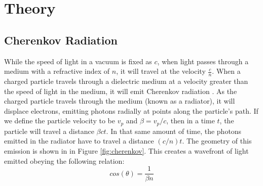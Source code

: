 
\chapter{Theory}
\label{ch:Theory}

\section{Cherenkov Radiation}
\label{sec:cherenkov}
While the speed of light in a vacuum is fixed as $c$, when light passes through a medium with a refractive index of $n$, it will travel at the velocity $\frac{c}{n}$.
When a charged particle travels through a dielectric medium at a velocity greater than the speed of light in the medium, it will emit Cherenkov radiation \cite{cherenkov}.
As the charged particle travels through the medium (known as a radiator), it will displace electrons, emitting photons radially at points along the particle's path.
If we define the particle velocity to be $v_p$ and $\beta = v_p / c$, then in a time $t$, the particle will travel a distance $\beta ct$.
In that same amount of time, the photons emitted in the radiator have to travel a distance $(c/n)t$.
The geometry of this emission is shown in in Figure \ref{fig:cherenkov}.
This creates a wavefront of light emitted obeying the following relation:
\begin{equation}
    cos(\theta) = \frac{1}{\beta n}
    \label{eq:cherenkovAngle}
\end{equation}


